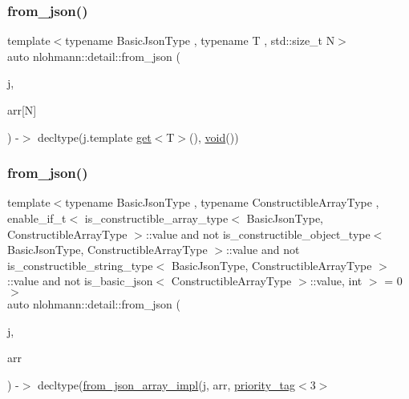 \mbox{\label{namespacenlohmann_1_1detail_a7deb2db8eed6f1762373dde7a6595760}} 
\subsubsection{\texorpdfstring{from\+\_\+json()}{from\_json()}\hspace{0.1cm}{\footnotesize\ttfamily [11/18]}}
{\footnotesize\ttfamily template$<$typename Basic\+Json\+Type , typename T , std\+::size\+\_\+t N$>$ \\
auto nlohmann\+::detail\+::from\+\_\+json (\begin{DoxyParamCaption}\item[{const Basic\+Json\+Type \&}]{j,  }\item[{T(\&)}]{arr\mbox{[}\+N\mbox{]} }\end{DoxyParamCaption}) -\/$>$ decltype(j.\+template \hyperlink{namespacenlohmann_1_1detail_acc422c11342b31368f610b6f96fcedc6}{get}$<$T$>$(), \hyperlink{namespacenlohmann_1_1detail_a59fca69799f6b9e366710cb9043aa77d}{void}())
}

\mbox{\label{namespacenlohmann_1_1detail_a14d8cdf544585f1c38eab6a0820e55f7}} 
\subsubsection{\texorpdfstring{from\+\_\+json()}{from\_json()}\hspace{0.1cm}{\footnotesize\ttfamily [12/18]}}
{\footnotesize\ttfamily template$<$typename Basic\+Json\+Type , typename Constructible\+Array\+Type , enable\+\_\+if\+\_\+t$<$ is\+\_\+constructible\+\_\+array\+\_\+type$<$ Basic\+Json\+Type, Constructible\+Array\+Type $>$\+::value and not is\+\_\+constructible\+\_\+object\+\_\+type$<$ Basic\+Json\+Type, Constructible\+Array\+Type $>$\+::value and not is\+\_\+constructible\+\_\+string\+\_\+type$<$ Basic\+Json\+Type, Constructible\+Array\+Type $>$\+::value and not is\+\_\+basic\+\_\+json$<$ Constructible\+Array\+Type $>$\+::value, int $>$  = 0$>$ \\
auto nlohmann\+::detail\+::from\+\_\+json (\begin{DoxyParamCaption}\item[{const Basic\+Json\+Type \&}]{j,  }\item[{Constructible\+Array\+Type \&}]{arr }\end{DoxyParamCaption}) -\/$>$ decltype(\hyperlink{namespacenlohmann_1_1detail_a40f7bb070a60e8ba14fffb9c117fcbd8}{from\+\_\+json\+\_\+array\+\_\+impl}(j, arr, \hyperlink{structnlohmann_1_1detail_1_1priority__tag}{priority\+\_\+tag}$<$3$>$ }

